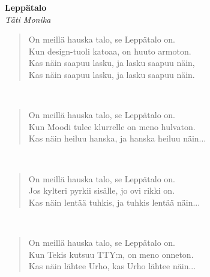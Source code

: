 %
%
\noindent\begin{minipage}{\linewidth}
\vspace{5pt}
\parbox[t]{0.85\linewidth}{\raggedright {\large\bf Leppätalo}\\[2pt]\small\emph{Täti Monika}\\[6pt]}
\begin{verse}
	
	On meillä hauska talo, se Leppätalo on.\\
	Kun design-tuoli katoaa, on huuto armoton.\\
	Kas näin saapuu lasku, ja lasku saapuu näin,\\
	Kas näin saapuu lasku, ja lasku saapuu näin.\\
\end{verse}
\end{minipage}\\[10pt]
\noindent\begin{minipage}{\linewidth}
\begin{verse}
	On meillä hauska talo, se Leppätalo on.\\
	Kun Moodi tulee klurrelle on meno hulvaton.\\
	Kas näin heiluu hanska, ja hanska heiluu näin...\\
\end{verse}
\end{minipage}\\[10pt]
\noindent\begin{minipage}{\linewidth}
\begin{verse}
	On meillä hauska talo, se Leppätalo on.\\
	Jos kylteri pyrkii sisälle, jo ovi rikki on.\\
	Kas näin lentää tuhkis, ja tuhkis lentää näin...\\
\end{verse}
\end{minipage}\\[10pt]
\noindent\begin{minipage}{\linewidth}
\begin{verse}
	On meillä hauska talo, se Leppätalo on.\\
	Kun Tekis kutsuu TTY:n, on meno onneton.\\
	Kas näin lähtee Urho, kas Urho lähtee näin...\\
\end{verse}
\end{minipage}\\[10pt]
